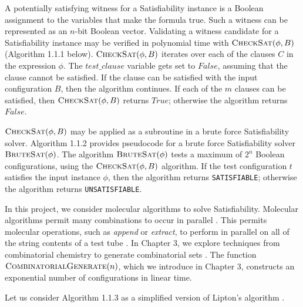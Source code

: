 A potentially satisfying witness for a {\sc Satisfiability} instance is a Boolean assignment to the variables that make the formula true.  Such a witness can be represented as an $n$-bit Boolean vector.  Validating a witness candidate for a {\sc Satisfiability} instance may be verified in polynomial time with $\text{\sc CheckSat}(\phi, B)$ (Algorithm 1.1.1 below).  $\text{\sc CheckSat}(\phi, B)$ iterates over each of the clauses $C$ in the expression $\phi$.  The $test\_clause$ variable gets set to $False$, assuming that the clause cannot be satisfied.  If the clause can be satisfied with the input configuration $B$, then the algorithm continues.  If each of the $m$ clauses can be satisfied, then $\text{\sc CheckSat}(\phi, B)$ returns $True$; otherwise the algorithm returns $False$.



$\text{\sc CheckSat}(\phi, B)$ may be applied as a subroutine in a brute force {\sc Satisfiability} solver.  Algorithm 1.1.2 provides pseudocode for a brute force {\sc Satisfiability} solver $\text{\sc BruteSat}(\phi)$.  The algorithm $\text{\sc BruteSat}(\phi)$ tests a maximum of $2^n$ Boolean configurations, using the $\text{\sc CheckSat}(\phi, B)$ algorithm.  If the test configuration $t$ satisfies the input instance $\phi$, then the algorithm returns \texttt{SATISFIABLE}; otherwise the algorithm returns \texttt{UNSATISFIABLE}.

In this project, we consider molecular algorithms to solve {\sc Satisfiability}.  Molecular algorithms permit many combinations to occur in parallel \cite{Adleman:1994:MCS:189441.189442, Lipton95usingdna}.  This permits molecular operations, such as \textit{append} or \textit{extract}, to perform in parallel on all of the string contents of a test tube \cite{Adleman:1994:MCS:189441.189442, Lipton95usingdna, dnaComputingModels2008}.  In Chapter 3, we explore techniques from combinatorial chemistry to generate combinatorial sets \cite{Lipton95usingdna, furkaBook, dnaComputingModels2008}.  The function $\text{\sc CombinatorialGenerate}(n)$, which we introduce in Chapter 3, constructs an exponential number of configurations in linear time.

Let us consider Algorithm 1.1.3 as a simplified version of Lipton's algorithm \cite{Lipton95usingdna, dnaComputingModels2008}.  



